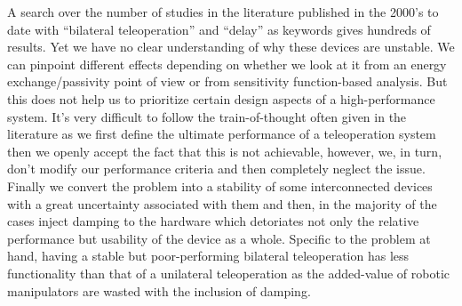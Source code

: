 A search over the number of studies in the literature published in the 2000's to date with \enquote{bilateral teleoperation} and \enquote{delay} 
as keywords gives hundreds of results. Yet we have no clear understanding of why these devices are unstable. We can pinpoint different effects 
depending on whether we look at it from an energy exchange/passivity point of view or from sensitivity function-based analysis. But this
does not help us to prioritize certain design aspects of a high-performance system. It's very difficult to follow the train-of-thought
often given in the literature as we first define the ultimate performance of a teleoperation system then we openly accept the fact that
this is not achievable, however, we, in turn, don't modify our performance criteria and then completely neglect the issue. Finally we 
convert the problem into a stability of some interconnected devices with a great uncertainty associated with them and then, in the majority
of the cases inject damping to the hardware which detoriates not only the relative performance but usability of the device as a whole.
Specific to the problem at hand, having a stable but poor-performing bilateral teleoperation has less functionality than that of a 
unilateral teleoperation as the added-value of robotic manipulators are wasted with the inclusion of damping. 














%
%
%
%
%





%
%
%
%
%



